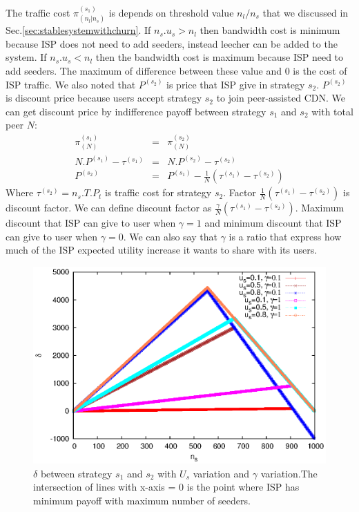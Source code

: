 \documentclass[paper]{ieice}
\begin{document}
The traffic cost $\pi^{(s_1)}_{(n_l|n_s)}$ is depends on threshold value $n_l/n_s$ that we discussed in Sec.\ref{sec:stablesystemwithchurn}.
If $n_s . u_s > n_l$ then bandwidth cost is minimum because ISP does not need to add seeders, instead leecher can be added to the system.  
If $n_s . u_s < n_l$ then the bandwidth cost is maximum because ISP need to add seeders.  
The maximum of difference between these value and 0 is the cost of ISP traffic.
We also noted that $P^{(s_2)}$ is price that ISP give in strategy $s_2$. 
$P^{(s_2)}$ is discount price because users accept strategy $s_2$ to join peer-assisted CDN.  
We can get discount price by indifference payoff between strategy $s_1$ and $s_2$ with total peer $N$:
\begin{eqnarray}  
	\pi^{(s_1)}_{(N)} &=& \pi^{(s_2)}_{(N)}\\
	N.P^{(s_1)} - \tau^{(s_1)} &=& N.P^{(s_2)} - \tau^{(s_2)}\\
	P^{(s_2)} &=& P^{(s_1)} - \frac{1}{N} (\tau^{(s_1)} -  \tau^{(s_2)} ) 
\end{eqnarray}
Where $\tau^{(s_2)}=n_s.T.P_t$ is traffic cost for strategy $s_2$.
Factor $\frac{1}{N} (\tau^{(s_1)} -  \tau^{(s_2)} )$ is discount factor.
We can define discount factor as $\frac{\gamma}{N} (\tau^{(s_1)} -  \tau^{(s_2)} )$.
Maximum discount that ISP can give to user when $\gamma=1$ and minimum discount that ISP can give to user when $\gamma=0$.
We can also say that $\gamma$ is a ratio that express how much of the ISP expected utility increase it wants to share with its users. 

\begin{figure}[thb] 
\begin{center}
\includegraphics[scale=0.65]{graphs/plotpay.eps}
\end{center}
\caption{$\delta$ between strategy $s_1$ and $s_2$ with $U_s$ variation and $\gamma$ variation.The intersection of lines with x-axis = 0 is the point where ISP has minimum payoff with maximum number of seeders. }
\label{fig:delta}
\vspace{-2mm}
 \end{figure}
 
\end{document}
